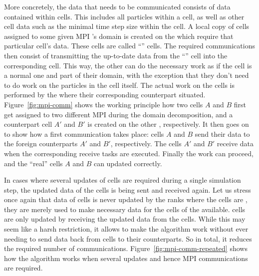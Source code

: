 More concretely, the data that needs to be communicated consists of data contained within cells.
This includes all particles within a cell, as well as other cell data such as the minimal time step
size within the cell. A local copy of cells assigned to some given MPI 's domain is
created on the  which require that particular cell's data. These cells are called
``'' cells. The required communications then consist of transmitting the up-to-date
data from the ``'' cell into the corresponding  cell. This way, the
other  can do the necessary work as if the  cell is a normal one and
part of their domain, with the exception that they don't need to do work on the particles in the
 cell itself. The actual work on the  cells is performed by the
 where their corresponding  counterpart situated. Figure~\ref{fig:mpi-comm}
shows the working principle how two cells $A$ and $B$ first get assigned to two different MPI
 during the domain decomposition, and a  counterpart cell $A'$ and $B'$
is created on the other , respectively. It then goes on to show how a first
communication takes place:  cells $A$ and $B$ send their data to the foreign
counterparts $A'$ and $B'$, respectively. The  cells $A'$ and $B'$ receive data when
the corresponding receive tasks are executed. Finally the work can proceed, and the ``real'' cells
$A$ and $B$ can updated correctly.

In cases where several updates of  cells are required during a single simulation
step, the updated data of the  cells is being sent and received again. Let us stress
once again that data of  cells is never updated by the ranks where the cells are
, they are merely used to make necessary data for the  cells of the
 available.  cells are only updated by receiving the updated data from
the  cells. While this may seem like a harsh restriction, it allows to make the
algorithm work without ever needing to send data back from  cells to their
 counterparts. So in total, it reduces the required number of communications.
Figure~\ref{fig:mpi-comm-repeated} shows how the algorithm works when several updates and hence MPI
communications are required.
















